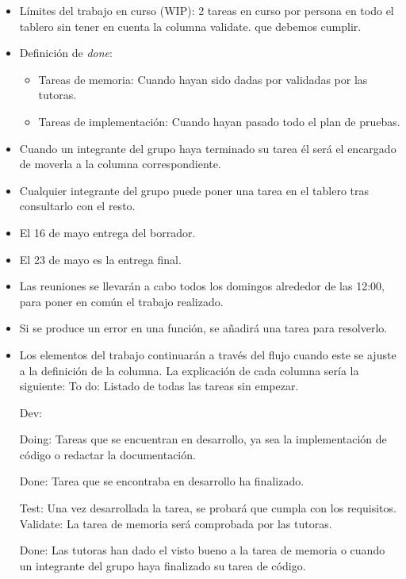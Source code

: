 \begin{itemize}
    \item Límites del trabajo en curso (WIP): 2 tareas en curso por persona en todo el tablero sin tener en cuenta la columna validate. que debemos cumplir.
    \item Definición de \textit{done}:
    \begin{itemize}
        \item Tareas de memoria: Cuando hayan sido dadas por validadas por las tutoras.
        \item Tareas de implementación: Cuando hayan pasado todo el plan de pruebas.
    \end{itemize}
    \item Cuando un integrante del grupo haya terminado su tarea él será el encargado de moverla a la columna correspondiente.
    \item Cualquier integrante del grupo puede poner una tarea en el tablero tras consultarlo con el resto.
    \item El 16 de mayo entrega del borrador.
    \item El 23 de mayo es la entrega final.
    \item Las reuniones se  llevarán a cabo todos los domingos alrededor de las 12:00, para poner en común el trabajo realizado.
    \item Si se produce un error en una función, se añadirá una tarea para resolverlo.
    \item Los elementos del trabajo continuarán a través del flujo cuando este se ajuste a la definición de la columna. La explicación de cada columna sería la siguiente:
    To do: Listado de todas las tareas sin empezar.

    Dev:

    \indent Doing: Tareas que se encuentran en desarrollo, ya sea la implementación de código o redactar la documentación. 
    
    \indent Done: Tarea que se encontraba en desarrollo ha finalizado.

    Test: Una vez desarrollada la tarea, se probará que cumpla con los requisitos.
    Validate: La tarea de memoria será comprobada por las tutoras.

    Done: Las tutoras han dado el visto bueno a la tarea de memoria o cuando un integrante del grupo haya finalizado su tarea de código. 




\end{itemize}

